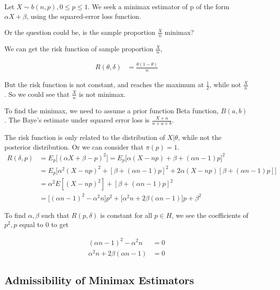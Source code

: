 \begin{Example}
Let $X \sim b(n,p), 0 \leq p \leq 1$. We seek a minimax estimator of p of the form $\alpha X + \beta$, using the squared-error loss function.

Or the question could be, is the sample proportion $\frac{X}{n}$ minimax? 

We can get the risk function of sample proportion $\frac{X}{n}$, 

\begin{align*}
R(\theta, \delta) &= \frac{\theta (1- \theta)}{n}
\end{align*}

But the risk function is not constant, and reaches the maximum at $\frac{1}{2}$, while not $\frac{X}{n}$. So we could see that $\frac{X}{n}$ is not minimax.

To find the minimax, we need to assume a prior function Beta function, $B(a,b)$. The Baye's estimate under squared error loss is $\frac{X + a}{n+ a +b}$.

The risk function is only related to the distribution of $X| \theta$, while not the posterior distribution. Or we can consider that $\pi(p) = 1$. 
 \begin{align*}
R(\delta, p) &= E_{p} \Big[ (\alpha X + \beta - p)^2 \Big] = E_{p} \Big[ \alpha (X - np) + \beta + (\alpha n-1) p \Big]^2 \\
&= E_{p} \Big[ \alpha^2 (X - np)^2 + [\beta + (\alpha n-1) p]^2 + 2 \alpha (X- np) [\beta + (\alpha n -1)p] \Big] \\
&= \alpha^2 E[(X-np)^2 ] + [\beta + (\alpha n -1) p]^2 \\
&= \Big[ (\alpha n -1)^2 - \alpha^2 n \Big] p^2 + \Big[ \alpha^2 n + 2 \beta(\alpha n -1) \Big] p + \beta^2
\end{align*}

To find $\alpha, \beta$ such that $R(p, \delta)$ is constant for all $p \in H$, we see the coefficients of $p^2, p$ equal to 0 to get

 \begin{align*}
(\alpha n -1)^2 - \alpha^2 n & = 0 \\
\alpha^2 n + 2 \beta(\alpha n -1) &= 0
\end{align*}

\end{Example}

\subsection{Admissibility of Minimax Estimators}

